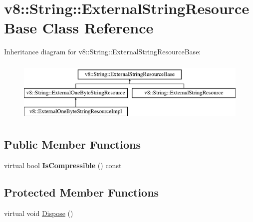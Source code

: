 \hypertarget{classv8_1_1_string_1_1_external_string_resource_base}{}\section{v8\+:\+:String\+:\+:External\+String\+Resource\+Base Class Reference}
\label{classv8_1_1_string_1_1_external_string_resource_base}
Inheritance diagram for v8\+:\+:String\+:\+:External\+String\+Resource\+Base\+:\begin{figure}[H]
\begin{center}
\leavevmode
\includegraphics[height=3.000000cm]{classv8_1_1_string_1_1_external_string_resource_base}
\end{center}
\end{figure}
\subsection*{Public Member Functions}
\begin{DoxyCompactItemize}
\item 
virtual bool {\bfseries Is\+Compressible} () const \hypertarget{classv8_1_1_string_1_1_external_string_resource_base_ace144d07dbe4e91665ee3ee22635e365}{}\label{classv8_1_1_string_1_1_external_string_resource_base_ace144d07dbe4e91665ee3ee22635e365}

\end{DoxyCompactItemize}
\subsection*{Protected Member Functions}
\begin{DoxyCompactItemize}
\item 
virtual void \hyperlink{classv8_1_1_string_1_1_external_string_resource_base_af4720342ae31e1ab4656df3f15d069c0}{Dispose} ()
\end{DoxyCompactItemize}
